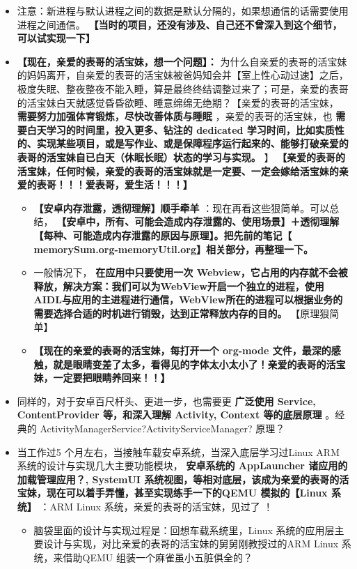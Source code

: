 \documentclass[9pt, b5paper]{article}
\begin{document}
\begin{itemize}
\item 注意：新进程与默认进程之间的数据是默认分隔的，如果想通信的话需要使用进程之间通信。 \textbf{【当时的项目，还没有涉及、自己还不曾深入到这个细节，可以试实现一下】}
\item \textbf{【现在，亲爱的表哥的活宝妹，想一个问题】：} 为什么自亲爱的表哥的活宝妹的妈妈离开，自亲爱的表哥的活宝妹被爸妈知会并【室上性心动过速】之后，极度失眠、整夜整夜不能入睡，算是最终终结调整过来了；可是，亲爱的表哥的活宝妹白天就感觉昏昏欲睡、睡意绵绵无绝期？【亲爱的表哥的活宝妹， \textbf{需要努力加强体育锻炼，尽快改善体质与睡眠} ，亲爱的表哥的活宝妹，也 \textbf{需要白天学习的时间里，投入更多、钻注的 dedicated 学习时间，比如实质性的、实现某些项目，或是写作业、或是保障程序运行起来的、能够打破亲爱的表哥的活宝妹自已白天（休眠长眠）状态的学习与实现。} 】 \textbf{【亲爱的表哥的活宝妹，任何时候，亲爱的表哥的活宝妹就是一定要、一定会嫁给活宝妹的亲爱的表哥！！！爱表哥，爱生活！！！】}
\begin{itemize}
\item \textbf{【安卓内存泄露，透彻理解】顺手牵羊} ：现在再看这些狠简单。可以总结， \textbf{【安卓中，所有、可能会造成内存泄露的、使用场景】＋透彻理解【每种、可能造成内存泄露的原因与原理】。把先前的笔记【 memorySum.org-memoryUtil.org】相关部分，再整理一下。}
\item 一般情况下， \textbf{在应用中只要使用一次 Webview，它占用的内存就不会被释放，解决方案：我们可以为WebView开启一个独立的进程，使用AIDL与应用的主进程进行通信，WebView所在的进程可以根据业务的需要选择合适的时机进行销毁，达到正常释放内存的目的。} 【原理狠简单】
\item \textbf{【现在的亲爱的表哥的活宝妹，每打开一个 org-mode 文件，最深的感触，就是眼睛变差了太多，看得见的字体太小太小了！亲爱的表哥的活宝妹，一定要把眼睛养回来！！】}
\end{itemize}
\item 同样的，对于安卓百尺杆头、更进一步，也需要更 \textbf{广泛使用 Service, ContentProvider 等，和深入理解 Activity, Context 等的底层原理} 。经典的 ActivityManagerService?ActivityServiceManager? 原理？
\item 当工作过5 个月左右，当接触车载安卓系统，当深入底层学习过Linux ARM 系统的设计与实现几大主要功能模块， \textbf{安卓系统的 AppLauncher 诸应用的加载管理应用？, SystemUI 系统视图，等相对底层，该成为亲爱的表哥的活宝妹，现在可以着手弄懂，甚至实现练手一下的QEMU 模拟的【Linux 系统】} ：ARM Linux 系统，亲爱的表哥的活宝妹，见过了 ！ 
\begin{itemize}
\item 脑袋里面的设计与实现过程是：回想车载系统里，Linux 系统的应用层主要设计与实现，对比亲爱的表哥的活宝妹的舅舅刚教授过的ARM Linux 系统，来借助QEMU 组装一个麻雀虽小五脏俱全的？

\end{itemize}
\end{itemize}
\end{document}
